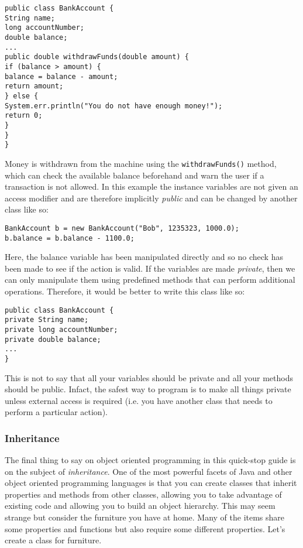 \begin{verbatim}
public class BankAccount {
String name;
long accountNumber;
double balance;
...
public double withdrawFunds(double amount) {
if (balance > amount) {
balance = balance - amount;
return amount;
} else {
System.err.println("You do not have enough money!");
return 0;
}
}
}
\end{verbatim}

\noindent
Money is withdrawn from the machine using the {\tt withdrawFunds()} method, which can check the available balance beforehand and warn the user if a transaction is not allowed. In this example the instance variables are not given an access modifier and are therefore implicitly \emph{public} and can be changed by another class like so:

\begin{verbatim}
BankAccount b = new BankAccount("Bob", 1235323, 1000.0);
b.balance = b.balance - 1100.0;
\end{verbatim}

\noindent
Here, the balance variable has been manipulated directly and so no check has been made to see if the action is valid. If the variables are made \emph{private}, then we can only manipulate them using predefined methods that can perform additional operations. Therefore, it would be better to write this class like so:

\begin{verbatim}
public class BankAccount {
private String name;
private long accountNumber;
private double balance;
...
}
\end{verbatim}

\noindent
This is not to say that all your variables should be private and all your methods should be public. Infact, the safest way to program is to make all things private unless external access is required (i.e. you have another class that needs to perform a particular action).

\subsubsection*{Inheritance}

The final thing to say on object oriented programming in this quick-stop guide is on the subject of \emph{inheritance}. One of the most powerful facets of Java and other object oriented programming languages is that you can create classes that inherit properties and methods from other classes, allowing you to take advantage of existing code and allowing you to build an object hierarchy. This may seem strange but consider the furniture you have at home. Many of the items share some properties and functions but also require some different properties. Let's create a class for furniture.

